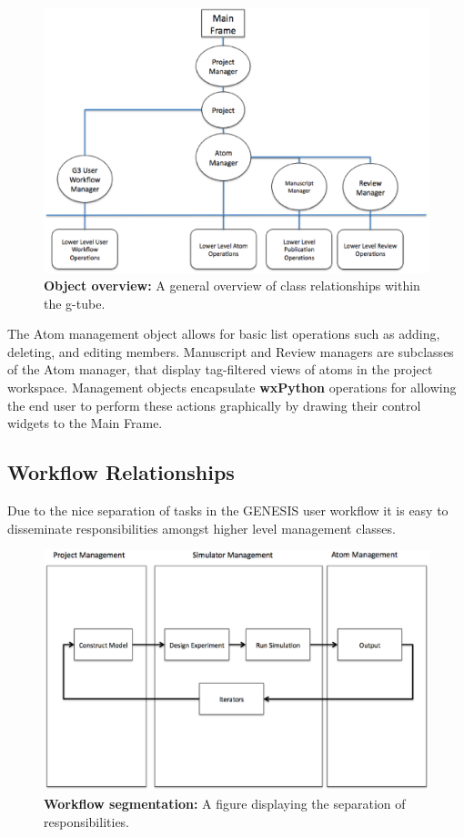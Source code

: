 \documentclass[12pt]{article}
\begin{document}
\begin{figure}[ht]
   \centering
   \includegraphics[scale=0.50]{figures/Overview.eps}
   \caption{{\bf Object overview:} A general overview of class relationships within the g-tube.}
   \label{figure: 1}
\end{figure}


The Atom management object allows for basic list operations such as adding, deleting, and editing members. Manuscript and Review managers are subclasses of the Atom manager, that display tag-filtered views of atoms in the project workspace. Management objects encapsulate {\bf wxPython} operations for allowing the end user to perform these actions graphically by drawing their control widgets to the Main Frame. 

\subsection*{Workflow Relationships}

	Due to the nice separation of tasks in the GENESIS user workflow it is easy to disseminate responsibilities amongst higher level management classes.

\begin{figure}[ht]
   \centering
   \includegraphics[scale=0.40]{figures/WorkflowSegmentation.eps}
   \caption{{\bf Workflow segmentation:} A figure displaying the separation of responsibilities.}
   \label{figure: 2}
\end{figure}
\end{document}
